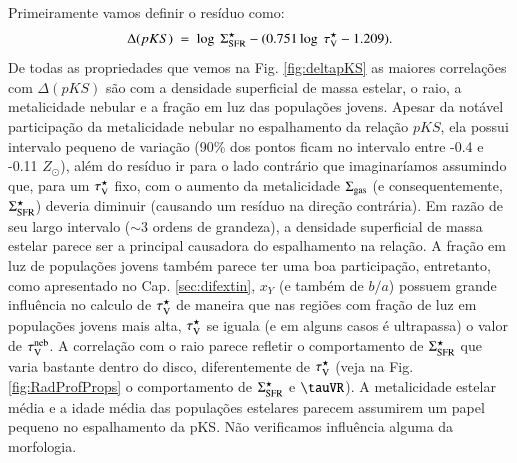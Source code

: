 Primeiramente vamos definir o resíduo como:
\begin{equation}
	\Delta(pKS)\ =\ \log\ \SigmaSFR - (0.751 \log\ \tauVS - 1.209).
	\label{eq:DeltapKS}
\end{equation}
\noindent De todas as propriedades que vemos na Fig. \ref{fig:deltapKS} as maiores correlações
com $\Delta(pKS)$ são com a densidade superficial de massa estelar, o raio, a metalicidade nebular e
a fração em luz das populações jovens. Apesar da notável participação da metalicidade nebular no
espalhamento da relação $pKS$, ela possui intervalo pequeno de variação (90\% dos
pontos ficam no intervalo entre -0.4 e -0.11 $Z_\odot$), além do resíduo ir para o lado contrário
que imaginaríamos assumindo que, para um $\tau_{\mathrm{V}}^\star$ fixo, com o aumento da metalicidade $\Sigma_{\mathrm{gas}}$
(e consequentemente, $\Sigma_{\mathrm{SFR}}^\star$) deveria diminuir (causando um resíduo na direção contrária). Em
razão de seu largo intervalo ($\sim 3$ ordens de grandeza), a densidade superficial de massa
estelar parece ser a principal causadora do espalhamento na relação. A fração em luz de populações
jovens também parece ter uma boa participação, entretanto, como apresentado no Cap.
\ref{sec:difextin}, $x_Y$ (e também de $b/a$) possuem grande influência no calculo de $\tau_{\mathrm{V}}^\star$ de
maneira que nas regiões com fração de luz em populações jovens mais alta, $\tau_{\mathrm{V}}^\star$ se iguala (e em
alguns casos é ultrapassa) o valor de $\tau_{\mathrm{V}}^{\mathrm{neb}}$. A correlação com o raio parece refletir o
comportamento de $\Sigma_{\mathrm{SFR}}^\star$ que varia bastante dentro do disco, diferentemente de $\tau_{\mathrm{V}}^\star$ (veja
na Fig. \ref{fig:RadProfProps} o comportamento de $\Sigma_{\mathrm{SFR}}^\star$ e $\tauVR$). A metalicidade estelar
média e a idade média das populações estelares parecem assumirem um papel pequeno no espalhamento
da pKS. Não verificamos influência alguma da morfologia.

